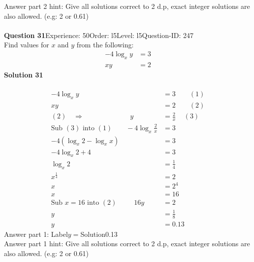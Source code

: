 \documentclass{article}
\begin{document}
Answer part 2 hint: \hspace{15pt}Give all solutions correct to 2 d.p, exact integer solutions are also allowed. (e.g: 2 or 0.61)\\
\\[4pt]
\noindent\textbf{Question 31}\hspace{20pt}Experience: 50\hspace{20pt}Order: l5\hspace{20pt}Level: l5\hspace{20pt}Question-ID: 247\\[2pt]
Find values for $x$ and $y$ from the following:
\begin{align*}
-4\log_{x}y&=3\\[2pt]
xy&=2
\end{align*}
\noindent\textbf{Solution 31}\\[2pt]
\\[-35pt]\begin{align*}
-4\log_{x}y&=3\qquad (1)\\[2pt]
xy&=2\qquad (2)\\[2pt]
(2) \quad\Rightarrow\hspace{80pt} y&=\displaystyle\frac{2}{x}\hspace{14pt} (3)\\[2pt]
\text{Sub}\,\,(3)\,\,\text{into}\,\,(1)\qquad -4\log_{x}\displaystyle\frac{2}{x}&=3\\[2pt]
-4(\log_{x}2-\log_{x}x)&=3\\[2pt]
-4\log_{x}2+4&=3\\[2pt]
\log_{x}2&=\displaystyle\frac{1}{4}\\[2pt]
x^{\frac{1}{4}}&=2\\[2pt]
x&=2^4\\[2pt]
x&=16\\[12pt]
\text{Sub}\,\,x=16\,\,\text{into}\,\,(2)\hspace{30pt}16y&=2\\[2pt]
y&=\displaystyle\frac{1}{8}\\[2pt]
y&=0.13
\end{align*}
Answer part 1: \hspace{10pt}Label\hspace{10pt}$y=$\hspace{10pt}Solution\hspace{10pt}0.13\\
Answer part 1 hint: \hspace{15pt}Give all solutions correct to 2 d.p, exact integer solutions are also allowed. (e.g: 2 or 0.61)\\
\end{document}
